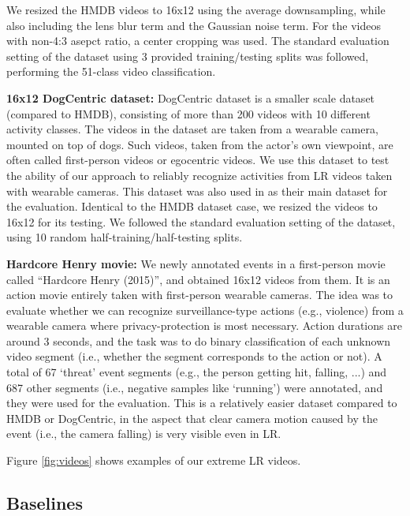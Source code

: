 \documentclass[letterpaper]{article} %
\begin{document}
We resized the HMDB videos to 16x12 using the average downsampling, while also including the lens blur term and the Gaussian noise term. For the videos with non-4:3 asepct ratio, a center cropping was used. The standard evaluation setting of the dataset using 3 provided training/testing splits was followed, performing the 51-class video classification.

{\flushleft\textbf{16x12 DogCentric dataset:} DogCentric dataset \cite{dogcentric} is a smaller scale dataset (compared to HMDB), consisting of more than 200 videos with 10 different activity classes. The videos in the dataset are taken from a wearable camera, mounted on top of dogs. Such videos, taken from the actor's own viewpoint, are often called first-person videos or egocentric videos. We use this dataset to test the ability of our approach to reliably recognize activities from LR videos taken with wearable cameras. This dataset was also used in \cite{ryoo17privacy}  as their main dataset for the evaluation. Identical to the HMDB dataset case, we resized the videos to 16x12 for its testing. We followed  the standard evaluation setting of the dataset, using 10 random half-training/half-testing splits.}

{\flushleft\textbf{Hardcore Henry movie:} We newly annotated events in a first-person movie called ``Hardcore Henry (2015)'', and obtained 16x12 videos from them. It is an action movie entirely taken with first-person wearable cameras. The idea was to evaluate whether we can recognize surveillance-type actions (e.g., violence) from a wearable camera where privacy-protection is most necessary. Action durations are around 3 seconds, and the task was to do binary classification of each unknown video segment (i.e., whether the segment corresponds to the action or not). A total of 67 `threat' event segments (e.g., the person getting hit, falling, ...) and 687 other segments (i.e., negative samples like `running') were annotated, and they were used for the evaluation. This is a relatively easier dataset compared to HMDB or DogCentric, in the aspect that clear camera motion caused by the event (i.e., the camera falling) is very visible even in LR.}

Figure \ref{fig:videos} shows examples of our extreme LR videos.

\subsection{Baselines}
\end{document}
